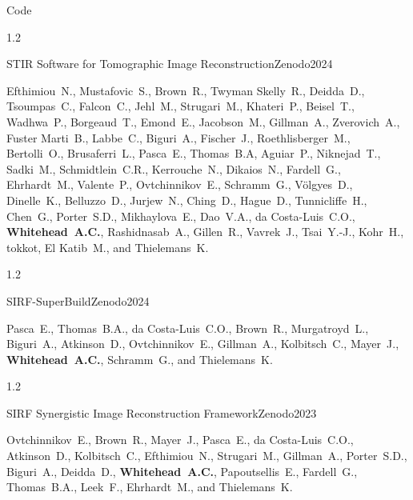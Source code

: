 \documentclass{cv}
\begin{document}
    \vspace{-0.5cm}
    \begin{rSection}{Code}
        \vspace{-0.5cm}
        \begin{spacing}{1.2}
            \item \begin{rSubsection}{STIR Software for Tomographic Image Reconstruction}{}{Zenodo}{2024}
                \vspace{-0.25cm}
                \item Efthimiou~N., Mustafovic~S., Brown~R., Twyman Skelly~R., Deidda~D., Tsoumpas~C., Falcon~C., Jehl~M., Strugari~M., Khateri~P., Beisel~T., Wadhwa~P., Borgeaud~T., Emond~E., Jacobson~M., Gillman~A., Zverovich~A., Fuster Marti~B., Labbe~C., Biguri~A., Fischer~J., Roethlisberger~M., Bertolli~O., Brusaferri~L., Pasca~E., Thomas~B.A, Aguiar~P., Niknejad~T., Sadki~M., Schmidtlein~C.R., Kerrouche~N., Dikaios~N., Fardell~G., Ehrhardt~M., Valente~P., Ovtchinnikov~E., Schramm~G., Völgyes~D., Dinelle~K., Belluzzo~D., Jurjew~N., Ching~D., Hague~D., Tunnicliffe~H., Chen~G., Porter~S.D., Mikhaylova~E., Dao~V.A., da Costa-Luis~C.O., \textbf{Whitehead~A.C.}, Rashidnasab~A., Gillen~R., Vavrek~J., Tsai~Y.-J., Kohr~H., tokkot, El Katib~M., and Thielemans~K.
            \end{rSubsection}
        \end{spacing}

        \vspace{-0.5cm}
        \begin{spacing}{1.2}
            \item \begin{rSubsection}{SIRF-SuperBuild}{}{Zenodo}{2024}
                \vspace{-0.25cm}
                \item Pasca~E., Thomas~B.A., da Costa-Luis~C.O., Brown~R., Murgatroyd~L., Biguri~A., Atkinson~D., Ovtchinnikov~E., Gillman~A., Kolbitsch~C., Mayer~J., \textbf{Whitehead~A.C.}, Schramm~G., and Thielemans~K.
            \end{rSubsection}
        \end{spacing}

        \vspace{-0.5cm}
        \begin{spacing}{1.2}
            \item \begin{rSubsection}{SIRF Synergistic Image Reconstruction Framework}{}{Zenodo}{2023}
                \vspace{-0.25cm}
                \item Ovtchinnikov~E., Brown~R., Mayer~J., Pasca~E., da Costa-Luis~C.O., Atkinson~D., Kolbitsch~C., Efthimiou~N., Strugari~M., Gillman~A., Porter~S.D., Biguri~A., Deidda~D., \textbf{Whitehead~A.C.}, Papoutsellis~E., Fardell~G., Thomas~B.A., Leek~F., Ehrhardt~M., and Thielemans~K.
            \end{rSubsection}
        \end{spacing}


\end{rSection}
\end{document}

